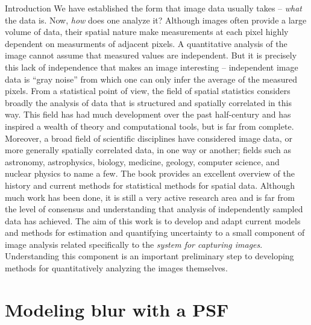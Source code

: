 \begin{chapter}{Introduction}
  We have established the form that image data usually takes -- \emph{what} the data is. 
  Now, \emph{how} does one analyze it?
  Although images often provide a large volume of data, their spatial nature make measurements at each pixel highly dependent on measurments of adjacent pixels.
  A quantitative analysis of the image cannot assume that measured values are independent.
  But it is precisely this lack of independence that makes an image interesting -- independent image data is ``gray noise'' from which one can only infer the average of the measured pixels.
  From a statistical point of view, the field of spatial statistics considers broadly the analysis of data that is structured and spatially correlated in this way.
  This field has had much development over the past half-century and has inspired a wealth of theory and computational tools, but is far from complete.
  Moreover, a broad field of scientific disciplines have considered image data, or more generally spatially correlated data, in one way or another; fields such as astronomy, astrophysics, biology, medicine, geology, computer science, and nuclear physics to name a few.
  The book \citep{cressie1993statistics} provides an excellent overview of the history and current methods for statistical methods for spatial data.
  Although much work has been done, it is still a very active research area and is far from the level of consensus and understanding that analysis of independently sampled data has achieved. 
  The aim of this work is to develop and adapt current models and methods for estimation and quantifying uncertainty to a small component of image analysis related specifically to the \emph{system for capturing images}.
  Understanding this component is an important preliminary step to developing methods for quantitatively analyzing the images themselves.

\section{Modeling blur with a PSF}
  

\end{chapter}
